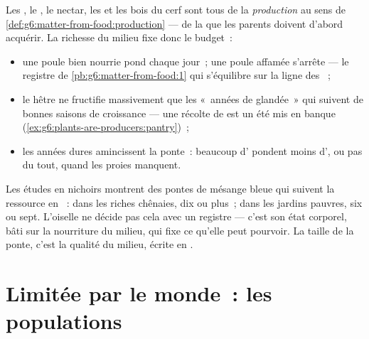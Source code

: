 \begin{proposition}\label{prop:g8:reproduction-and-environment:cost}
Les , le , le nectar, les  et les bois du cerf sont
tous de la \emph{production} au sens de
\cref{def:g6:matter-from-food:production} --- de la  que les parents doivent d'abord acquérir. La richesse du
milieu fixe donc le budget~:
\begin{itemize}
  \item une poule bien nourrie pond chaque jour~; une poule affamée
        s'arrête --- le registre de
        \cref{pb:g6:matter-from-food:1} qui s'équilibre sur la
        ligne des ~;
  \item le hêtre ne fructifie massivement que les «~années de
        glandée~» qui suivent de bonnes saisons de croissance ---
        une récolte de  est un été mis en banque
        (\cref{ex:g6:plants-are-producers:pantry})~;
  \item les années dures amincissent la ponte~: beaucoup d'
        pondent moins d', ou pas du tout, quand les proies
        manquent.
\end{itemize}
\end{proposition}
\admitted

\begin{example}\label{ex:g8:reproduction-and-environment:clutch}
Les études en nichoirs montrent des pontes de mésange bleue qui
suivent la ressource en ~: dans les riches chênaies, dix
 ou plus~; dans les jardins pauvres, six ou sept. L'oiselle ne
décide pas cela avec un registre --- c'est son état corporel, bâti
sur la nourriture du milieu, qui fixe ce qu'elle peut pourvoir. La
taille de la ponte, c'est la qualité du milieu, écrite en .
\end{example}

\section{Limitée par le monde~: les populations}

